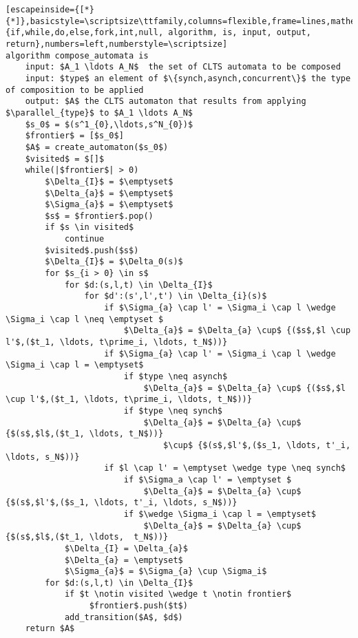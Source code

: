 \renewcommand{\ttdefault}{pcr}
\begin{lstlisting}[escapeinside={[*}{*]},basicstyle=\scriptsize\ttfamily,columns=flexible,frame=lines,mathescape=true,xleftmargin=3.0ex,keywordstyle=\textbf,morekeywords={if,while,do,else,fork,int,null, algorithm, is, input, output, return},numbers=left,numberstyle=\scriptsize]
algorithm compose_automata is
	input: $A_1 \ldots A_N$  the set of CLTS automata to be composed
	input: $type$ an element of $\{synch,asynch,concurrent\}$ the type of composition to be applied
	output: $A$ the CLTS automaton that results from applying $\parallel_{type}$ to $A_1 \ldots A_N$
	$s_0$ = $(s^1_{0},\ldots,s^N_{0})$
	$frontier$ = [$s_0$]
	$A$ = create_automaton($s_0$)
	$visited$ = $[]$
	while(|$frontier$| > 0)
		$\Delta_{I}$ = $\emptyset$
		$\Delta_{a}$ = $\emptyset$
		$\Sigma_{a}$ = $\emptyset$		
		$s$ = $frontier$.pop()
		if $s \in visited$
			continue
		$visited$.push($s$)
		$\Delta_{I}$ = $\Delta_0(s)$
		for $s_{i > 0} \in s$ 
			for $d:(s,l,t) \in \Delta_{I}$
				for $d':(s',l',t') \in \Delta_{i}(s)$
					if $\Sigma_{a} \cap l' = \Sigma_i \cap l \wedge \Sigma_i \cap l \neq \emptyset $
						$\Delta_{a}$ = $\Delta_{a} \cup$ {($s$,$l \cup l'$,($t_1, \ldots, t\prime_i, \ldots, t_N$))}
					if $\Sigma_{a} \cap l' = \Sigma_i \cap l \wedge \Sigma_i \cap l = \emptyset$
						if $type \neq asynch$
							$\Delta_{a}$ = $\Delta_{a} \cup$ {($s$,$l \cup l'$,($t_1, \ldots, t\prime_i, \ldots, t_N$))}
						if $type \neq synch$							
							$\Delta_{a}$ = $\Delta_{a} \cup$ {$(s$,$l$,($t_1, \ldots, t_N$))} 
								$\cup$ {$(s$,$l'$,($s_1, \ldots, t'_i, \ldots, s_N$))}
					if $l \cap l' = \emptyset \wedge type \neq synch$
						if $\Sigma_a \cap l' = \emptyset $
							$\Delta_{a}$ = $\Delta_{a} \cup$ {$(s$,$l'$,($s_1, \ldots, t'_i, \ldots, s_N$))} 
						if $\wedge \Sigma_i \cap l = \emptyset$
							$\Delta_{a}$ = $\Delta_{a} \cup$ {$(s$,$l$,($t_1, \ldots,  t_N$))} 							
			$\Delta_{I} = \Delta_{a}$						
			$\Delta_{a} = \emptyset$						
			$\Sigma_{a}$ = $\Sigma_{a} \cup \Sigma_i$
		for $d:(s,l,t) \in \Delta_{I}$
			if $t \notin visited \wedge t \notin frontier$ 
				 $frontier$.push($t$)
			add_transition($A$, $d$)			
	return $A$

\end{lstlisting}